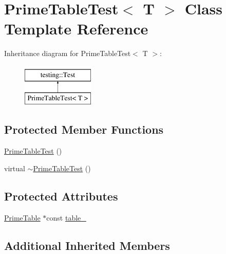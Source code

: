 \hypertarget{class_prime_table_test}{\section{Prime\-Table\-Test$<$ T $>$ Class Template Reference}
\label{class_prime_table_test}
}
Inheritance diagram for Prime\-Table\-Test$<$ T $>$\-:\begin{figure}[H]
\begin{center}
\leavevmode
\includegraphics[height=2.000000cm]{class_prime_table_test}
\end{center}
\end{figure}
\subsection*{Protected Member Functions}
\begin{DoxyCompactItemize}
\item 
\hyperlink{class_prime_table_test_ab83d0b24b41bff1ace55f9a8d5ea6dcf}{Prime\-Table\-Test} ()
\item 
virtual \hyperlink{class_prime_table_test_a4fb27ce277675d58ea3f8db99e3bb2b4}{$\sim$\-Prime\-Table\-Test} ()
\end{DoxyCompactItemize}
\subsection*{Protected Attributes}
\begin{DoxyCompactItemize}
\item 
\hyperlink{class_prime_table}{Prime\-Table} $\ast$const \hyperlink{class_prime_table_test_a86da90fc6d5cef6386d0cd8fb52b4046}{table\-\_\-}
\end{DoxyCompactItemize}
\subsection*{Additional Inherited Members}


